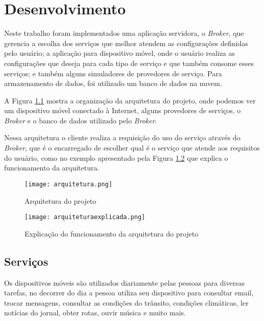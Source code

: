\chapter{Desenvolvimento}\label{cha:desenvolvimento}
Neste trabalho foram implementados uma aplicação servidora, o \textit{Broker}, que gerencia a escolha dos serviços que melhor atendem as configurações definidas pelo usuário; a aplicação para dispositivo móvel, onde o usuário realiza as configurações que deseja para cada tipo de serviço e que também consome esses serviços; e também alguns simuladores de provedores de serviço. Para armazenamento de dados, foi utilizado um banco de dados na nuvem.

A Figura \ref{fig:arquitetura} mostra a organização da arquitetura do projeto, onde podemos ver um dispositivo móvel conectado à Internet, alguns provedores de serviços, o \textit{Broker} e o banco de dados utilizado pelo \textit{Broker}.

Nessa arquitetura o cliente realiza a requisição do uso do serviço através do \textit{Broker}, que é o encarregado de escolher qual é o serviço que atende aos requisitos do usuário, como no exemplo apresentado pela Figura \ref{fig:arquiteturaexplicada} que explica o funcionamento da arquitetura.

\begin{figure}[!htb]
  \centering
  \texttt{[image: arquitetura.png]} %
  \caption[Arquitetura do projeto]{Arquitetura do projeto}
  \label{fig:arquitetura}
\end{figure}

\begin{figure}[!htb]
  \centering
  \texttt{[image: arquiteturaexplicada.png]} %
  \caption[Explicação do funcionamento da arquitetura do projeto]{Explicação do funcionamento da arquitetura do projeto}
  \label{fig:arquiteturaexplicada}
\end{figure}

\section{Serviços}
Os dispositivos móveis são utilizados diariamente pelas pessoas para diversas tarefas, no decorrer do dia a pessoa utiliza seu dispositivo para consultar email, trocar mensagens, consultar as condições do trânsito, condições climáticas, ler notícias do jornal, obter rotas, ouvir música e muito mais.

